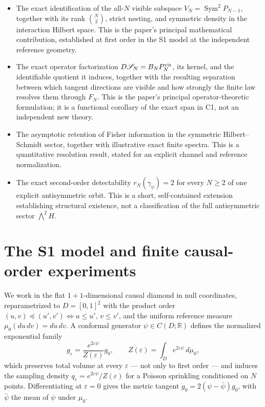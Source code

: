 \documentclass[11pt]{article}
\begin{document}
\begin{itemize}
\item[\textbf{C1}] The exact identification of the all-$N$ visible subspace $V_N=\operatorname{Sym}^2P_{N-1}$, together with its rank $\binom N2$, strict nesting, and symmetric density in the interaction Hilbert space. This is the paper's principal mathematical contribution, established at first order in the S1 model at the independent reference geometry.

\item[\textbf{C2}] The exact operator factorization $D\mathscr S_N=B_NP_N^{\rm vis}$, its kernel, and the identifiable quotient it induces, together with the resulting separation between which tangent directions are visible and how strongly the finite law resolves them through $F_N$. This is the paper's principal operator-theoretic formulation; it is a functional corollary of the exact span in C1, not an independent new theory.

\item[\textbf{C3}] The asymptotic retention of Fisher information in the symmetric Hilbert--Schmidt sector, together with illustrative exact finite spectra. This is a quantitative resolution result, stated for an explicit channel and reference normalization.

\item[\textbf{C4}] The exact second-order detectability $r_N(\gamma_\psi)=2$ for every $N\ge2$ of one explicit antisymmetric orbit. This is a short, self-contained extension establishing structural existence, not a classification of the full antisymmetric sector $\bigwedge^2H$.
\end{itemize}

\section{The S1 model and finite causal-order experiments}

We work in the flat $1+1$-dimensional causal diamond in null coordinates, reparametrized to $D=[0,1]^2$ with the product order $(u,v)\preceq(u',v')\iff u\le u',\,v\le v'$, and the uniform reference measure $\mu_0(du\,dv)=du\,dv$. A conformal generator $\psi\in C(D;\mathbb R)$ defines the normalized exponential family \[ g_\varepsilon=\frac{e^{2\varepsilon\psi}}{Z(\varepsilon)}g_0,\qquad Z(\varepsilon)=\int_De^{2\varepsilon\psi}\,d\mu_0, \] which preserves total volume at every $\varepsilon$ --- not only to first order --- and induces the sampling density $q_\varepsilon=e^{2\varepsilon \psi}/Z(\varepsilon)$ for a Poisson sprinkling conditioned on $N$ points. Differentiating at $\varepsilon=0$ gives the metric tangent $\dot g_0=2(\psi-\bar\psi)g_0$, with $\bar\psi$ the mean of $\psi$ under $\mu_0$.
\end{document}
